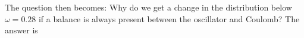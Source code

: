 The question then becomes: Why do we get a change in the distribution below $\omega=0.28$ if a balance is always present between the oscillator and Coulomb? The answer is 

\captionsetup[subfloat]{labelformat=empty}
\begin{figure}
 \begin{center}
   \\

\end{center}
\end{figure}
